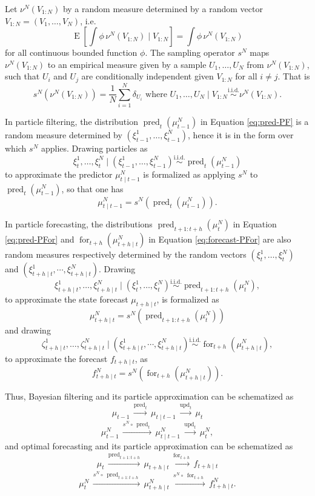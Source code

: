 \documentclass{article}
\newcommand{\simiid}{\overset{\text{i.i.d.}}{\sim}}
\DeclareMathOperator{\E}{E}
\DeclareMathOperator{\pred}{pred}
\DeclareMathOperator{\upd}{upd}
\DeclareMathOperator{\for}{for}
\begin{document}
Let $\nu^N(V_{1:N})$ by a random measure determined by a random vector $V_{1:N}=(V_1,\dots,V_N)$, i.e.
$$ \E[\int \phi \, \nu^N(V_{1:N}) \mid V_{1:N}] = \int \phi \, \nu^N(V_{1:N})$$
for all continuous bounded function $\phi$. The sampling operator $s^N$ maps $\nu^N(V_{1:N})$ to an empirical measure given by a sample $U_1,\dots,U_N$ from $\nu^N(V_{1:N})$, such that $U_i$ and $U_j$ are conditionally independent given $V_{1:N}$ for all $i \neq j$. That is
$$s^N(\nu^N(V_{1:N})) = \frac 1N \sum_{i=1}^N \delta_{U_i} \text{\ \ where\ } U_1,\dots,U_N \mid V_{1:N} \simiid \nu^N(V_{1:N}).$$

In particle filtering, the distribution $\pred_t(\mu^N_{t-1})$ in Equation \eqref{eq:pred-PF} is a random measure determined by $(\xi^1_{t-1},\dots,\xi^N_{t-1})$, hence it is in the form over which $s^N$ applies. Drawing particles as $$\xi^1_t,\dots,\xi^N_t \mid (\xi^1_{t-1},\dots,\xi^N_{t-1}) \simiid \pred_t(\mu^N_{t-1})$$
to approximate the predictor $\mu^N_{t \mid t-1}$ is formalized as applying $s^N$ to $\pred_t(\mu^N_{t-1})$, so that one has
$$ \mu^N_{t \mid t-1} = s^N(\pred_t(\mu^N_{t-1})).$$

In particle forecasting, the distributions $\pred_{t+1:t+h}(\mu^N_t)$ in Equation \eqref{eq:pred-PFor} and $\for_{t+h}(\mu^N_{t+h \mid t})$ in Equation \eqref{eq:forecast-PFor} are also random measures respectively determined by the random vectors $(\xi^1_t,\dots,\xi^N_t)$ and $(\xi^1_{t+h \mid t},\cdots,\xi^N_{t+h \mid t})$. Drawing
$$\xi^1_{t+h \mid t},\dots,\xi^N_{t+h \mid t} \mid (\xi^1_t,\dots,\xi^N_t) \simiid \pred_{t+1:t+h}(\mu^N_t),$$
to approximate the state forecast $\mu_{t+h \mid t}$, is formalized as
$$ \mu^N_{t+h \mid t} = s^N(\pred_{t+1:t+h}(\mu^N_t))$$
and drawing
$$ \zeta^1_{t+h \mid t},\dots,\zeta^N_{t+h \mid t} \mid (\xi^1_{t+h \mid t},\cdots,\xi^N_{t+h \mid t}) \simiid \for_{t+h}(\mu^N_{t+h \mid t}), $$
to approximate the forecast $f_{t+h \mid t}$, as
$$ f^N_{t+h \mid t} = s^N(\for_{t+h}(\mu^N_{t+h \mid t})).$$

Thus, Bayesian filtering and its particle approximation can be schematized as
\begin{equation*}
    \mu_{t-1} \, \overset{\pred_t}{\longrightarrow} \, \mu_{t \mid t-1} \, \overset{\upd_t}{\longrightarrow} \, \mu_t
\end{equation*}
\begin{equation*}
    \mu^N_{t-1} \, \overset{s^N \circ \, \pred_t}{\longrightarrow} \, \mu^N_{t \mid t-1} \, \overset{\upd_t}{\longrightarrow} \, \mu^N_t,
\end{equation*}
and optimal forecasting and its particle approximation can be schematized as
\begin{equation*}
    \mu_t \, \overset{\pred_{t+1:t+h}}{\longrightarrow} \, \mu_{t+h \mid t} \, \overset{\for_{t+h}}{\longrightarrow} \, f_{t+h \mid t}
\end{equation*}
\begin{equation*}
    \mu^N_t \, \overset{s^N \circ \, \pred_{t+1:t+h}}{\longrightarrow} \, \mu^N_{t+h \mid t} \, \overset{s^N \circ \, \for_{t+h}}{\longrightarrow} \, f^N_{t+h \mid t}.
\end{equation*}
\end{document}
